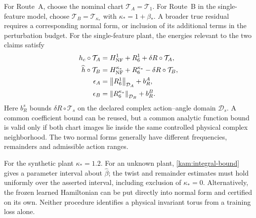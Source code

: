 For Route~A, choose the nominal chart $\mathcal T_A=\mathcal T_1$. For Route~B in the single-feature model, choose $\mathcal T_B=\mathcal T_{\kappa_*}$ with $\kappa_*=1+\beta_*$. A broader true residual requires a corresponding normal form, or inclusion of its additional terms in the perturbation budget. For the single-feature plant, the energies relevant to the two claims satisfy
\begin{equation}\label{kam:route-budgets}
\begin{aligned}
 h_c\circ\mathcal T_A
   &=H_{\rm NF}^{1}+R_6^{1}+\delta R\circ\mathcal T_A,\\
 \widehat h\circ\mathcal T_B
   &=H_{\rm NF}^{\kappa_*}+R_6^{\kappa_*}
                                      -\delta R\circ\mathcal T_B,\\
 \epsilon_A&=\left\lVert R_6^{1}\right\rVert_{\mathcal D_A}+b_R^A,\\
 \epsilon_B&=\left\lVert R_6^{\kappa_*}\right\rVert_{\mathcal D_B}+b_R^B.
\end{aligned}
\end{equation}
Here $b_R^s$ bounds $\delta R\circ\mathcal T_s$ on the declared complex action--angle domain $\mathcal D_s$. A common coefficient bound can be reused, but a common analytic function bound is valid only if both chart images lie inside the same controlled physical complex neighborhood. The two normal forms generally have different frequencies, remainders and admissible action ranges.

For the synthetic plant $\kappa_*=1.2$. For an unknown plant, \eqref{kam:integral-bound} gives a parameter interval about $\widehat\beta$; the twist and remainder estimates must hold uniformly over the asserted interval, including exclusion of $\kappa_*=0$. Alternatively, the frozen learned Hamiltonian can be put directly into normal form and certified on its own. Neither procedure identifies a physical invariant torus from a training loss alone.

